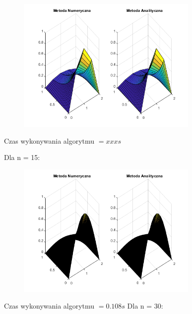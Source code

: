 \begin{figure}[!ht]
	\begin{center}
		\includegraphics[width=0.78\textwidth]{Lab7/charts/df/5_2.png}
	\end{center}
\end{figure}


Czas wykonywania algorytmu $ = xxx s$

Dla n = 15:

\begin{figure}[!ht]
	\begin{center}
		\includegraphics[width=0.78\textwidth]{Lab7/charts/df/15_2.png}
	\end{center}
\end{figure}


Czas wykonywania algorytmu $ = 0.108 s$
\newpage
Dla n = 30:


